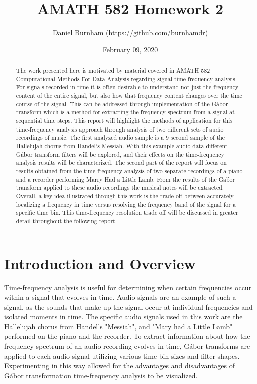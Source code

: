 \documentclass{article}
\title{AMATH 582 Homework 2}
\author{Daniel Burnham (https://github.com/burnhamdr)}
\date{February 09, 2020}
\begin{document}
\maketitle

\begin{abstract}
The work presented here is motivated by material covered in AMATH 582 Computational Methods For Data Analysis regarding signal time-frequency analysis. For signals recorded in time it is often desirable to understand not just the frequency content of the entire signal, but also how that frequency content changes over the time course of the signal. This can be addressed through implementation of the G\'abor transform which is a method for extracting the frequency spectrum from a signal at sequential time steps. This report will highlight the methods of application for this time-frequency analysis approach through analysis of two different sets of audio recordings of music. The first analyzed audio sample is a 9 second sample of the Hallelujah chorus from Handel's Messiah. With this example audio data different G\'abor transform filters will be explored, and their effects on the time-frequency analysis results will be characterized. The second part of the report will focus on results obtained from the time-frequency analysis of two separate recordings of a piano and a recorder performing Marry Had a Little Lamb. From the results of the Ga\'bor transform applied to these audio recordings the musical notes will be extracted. Overall, a key idea illustrated through this work is the trade off between accurately localizing a frequency in time versus resolving the frequency band of the signal for a specific time bin. This time-frequency resolution trade off will be discussed in greater detail throughout the following report.
\end{abstract}

\section{Introduction and Overview}
Time-frequency analysis is useful for determining when certain frequencies occur within a signal that evolves in time. Audio signals are an example of such a signal, as the sounds that make up the signal occur at individual frequencies and isolated moments in time. The specific audio signals used in this work are the Hallelujah chorus from Handel's "Messiah", and "Mary had a Little Lamb" performed on the piano and the recorder. To extract information about how the frequency spectrum of an audio recording evolves in time, G\'abor transforms are applied to each audio signal utilizing various time bin sizes and filter shapes. Experimenting in this way allowed for the advantages and disadvantages of G\'abor transformation time-frequency analysis to be visualized. 
\end{document}
